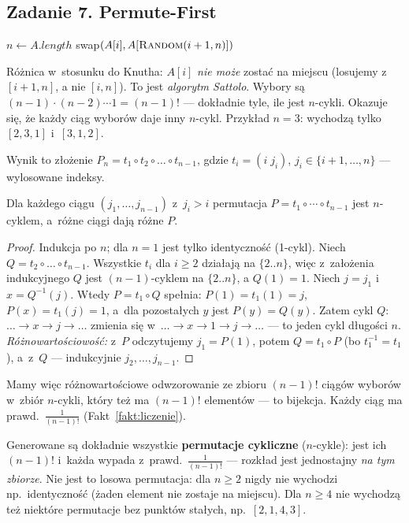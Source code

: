 \documentclass[11pt]{article}
\begin{document}
\subsection{Zadanie 7. Permute-First}
\begin{tresc}
\begin{algorithmic}[1]
\State $n\gets A.\mathit{length}$
  \State swap$(A[i],A[\textsc{Random}(i+1,n)])$
\EndFor
\end{algorithmic}
\end{tresc}

\begin{intuicja}
Różnica w~stosunku do Knutha: $A[i]$ \emph{nie może} zostać na miejscu
(losujemy z~$[i+1,n]$, a nie $[i,n]$). To jest \emph{algorytm Sattolo}.
Wybory są $(n-1)\cdot(n-2)\cdots1=(n-1)!$ --- dokładnie tyle, ile jest
$n$-cykli. Okazuje się, że każdy ciąg wyborów daje inny $n$-cykl.
Przykład $n=3$: wychodzą tylko $[2,3,1]$ i~$[3,1,2]$.
\end{intuicja}
\formalnie
Wynik to złożenie $P_n=t_1\circ t_2\circ\dots\circ t_{n-1}$, gdzie
$t_i=(i\;j_i)$, $j_i\in\{i+1,\dots,n\}$ --- wylosowane indeksy.

\begin{lemat}
Dla każdego ciągu $(j_1,\dots,j_{n-1})$ z~$j_i>i$ permutacja $P=t_1\circ\cdots\circ t_{n-1}$
jest $n$-cyklem, a~różne ciągi dają różne $P$.
\end{lemat}
\begin{proof}
Indukcja po $n$; dla $n=1$ jest tylko identyczność (1-cykl). Niech
$Q=t_2\circ\dots\circ t_{n-1}$. Wszystkie $t_i$ dla $i\ge2$ działają na
$\{2..n\}$, więc z~założenia indukcyjnego $Q$ jest $(n-1)$-cyklem na
$\{2..n\}$, a $Q(1)=1$. Niech $j=j_1$ i~$x=Q^{-1}(j)$. Wtedy $P=t_1\circ Q$ spełnia:
$P(1)=t_1(1)=j$, $P(x)=t_1(j)=1$, a~dla pozostałych $y$ jest $P(y)=Q(y)$.
Zatem cykl $Q$: $\dots\to x\to j\to\dots$ zmienia się w~$\dots\to x\to1\to j\to\dots$
--- to jeden cykl długości $n$.
\emph{Różnowartościowość:} z~$P$ odczytujemy $j_1=P(1)$, potem
$Q=t_1\circ P$ (bo $t_1^{-1}=t_1$), a~z~$Q$ --- indukcyjnie $j_2,\dots,j_{n-1}$.
\end{proof}
Mamy więc różnowartościowe odwzorowanie ze zbioru $(n-1)!$ ciągów wyborów
w~zbiór $n$-cykli, który też ma $(n-1)!$ elementów --- to bijekcja. Każdy
ciąg ma prawd.\ $\frac{1}{(n-1)!}$ (Fakt~\ref{fakt:liczenie}).
\begin{odpowiedz}
Generowane są dokładnie wszystkie \textbf{permutacje cykliczne} ($n$-cykle):
jest ich $(n-1)!$ i~każda wypada z~prawd.\ $\frac{1}{(n-1)!}$ --- rozkład jest
jednostajny \emph{na tym zbiorze}. Nie jest to losowa permutacja: dla $n\ge2$
nigdy nie wychodzi np.\ identyczność (żaden element nie zostaje na miejscu).
Dla $n\ge4$ nie wychodzą też niektóre permutacje bez punktów stałych, np.\ $[2,1,4,3]$.
\end{odpowiedz}
\end{document}
